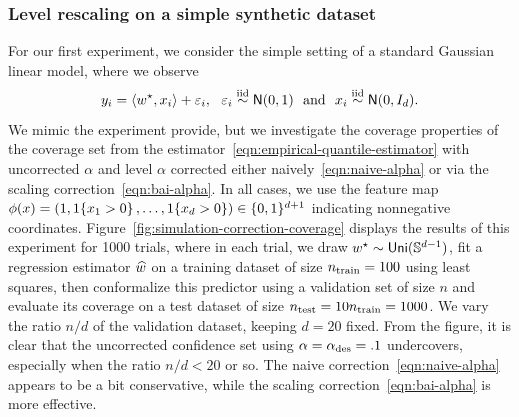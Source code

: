 \documentclass[11pt]{article}
\begin{document}
\subsubsection{Level rescaling on a simple synthetic dataset}


\newcommand{\noise}{\varepsilon}

For our first experiment, we consider the simple setting of
a standard Gaussian linear model, where we observe
\begin{equation*}
  y_i = \<w\opt, x_i\> + \noise_i,
  ~~ \noise_i \simiid \normal(0, 1)
  ~~ \mbox{and} ~~ x_i \simiid \normal(0, I_d).
\end{equation*}
We mimic the experiment \citet[Fig.~3]{GibbsChCa23} provide,
but we investigate the coverage properties of the
coverage set from the estimator~\eqref{eqn:empirical-quantile-estimator}
with uncorrected $\alpha$ and level $\alpha$ corrected
either naively~\eqref{eqn:naive-alpha} or via the scaling
correction~\eqref{eqn:bai-alpha}.
%
In all cases, we use the feature map $\phi(x) = (1, 1\!\left\{x_1 > 0\right\}, \ldots,
1\!\left\{x_d > 0\right\}) \in \{0, 1\}^{d + 1}$ indicating nonnegative coordinates.
%
Figure~\ref{fig:simulation-correction-coverage} displays the results of this
experiment for 1000 trials, where in each trial, we draw $w^\star \sim
\mathsf{Uni}(\mathbb{S}^{d-1})$, fit a regression estimator $\widehat{w}$ on a
training dataset of size $n_{\textup{train}} = 100$ using least squares,
then conformalize this predictor using a validation set of size $n$ and
evaluate its coverage on a test dataset of size $n_{\textup{test}} = 10
n_{\textup{train}} = 1000$.
%
We vary the
ratio $n / d$ of the validation dataset, keeping $d = 20$ fixed.
%
From the figure, it is clear that the uncorrected confidence
set using $\alpha = \alpha_{\textup{des}} = .1$
undercovers, especially when the ratio $n/d < 20$ or so.
%
The naive correction~\eqref{eqn:naive-alpha} appears to be a bit
conservative, while the scaling correction~\eqref{eqn:bai-alpha}
is more effective.
\end{document}
